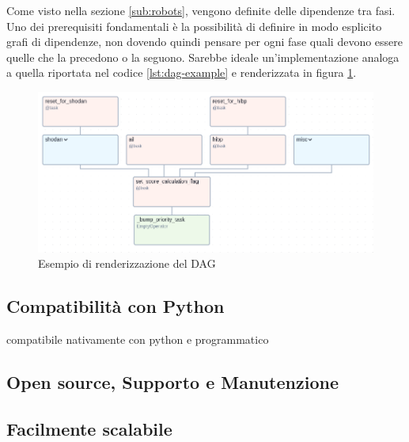 Come visto nella sezione \ref{sub:robots}, vengono definite delle dipendenze tra
fasi. Uno dei prerequisiti fondamentali è la possibilità di definire in modo
esplicito grafi di dipendenze, non dovendo quindi pensare per ogni fase quali devono
essere quelle che la precedono o la seguono. Sarebbe ideale un'implementazione
analoga a quella riportata nel codice \ref{lst:dag-example} e renderizzata in
figura \ref{fig:dag-example}.

\begin{figure}[htbp]
  \centering
  \begin{minipage}{0.45\textwidth}
    \centering
    
  \end{minipage}
  \hfill
  \begin{minipage}{0.45\textwidth}
    \centering
    \includegraphics[width=\textwidth]{images/dag-example.png}
    \caption{Esempio di renderizzazione del DAG}
    \label{fig:dag-example}
  \end{minipage}
\end{figure}

\subsection{Compatibilità con Python}
\label{sub:python_compatibility}

compatibile nativamente con python e programmatico

\subsection{Open source, Supporto e Manutenzione}
\label{sub:open_source}

\lipsum[1]

\subsection{Facilmente scalabile}
\label{sub:scalable}

